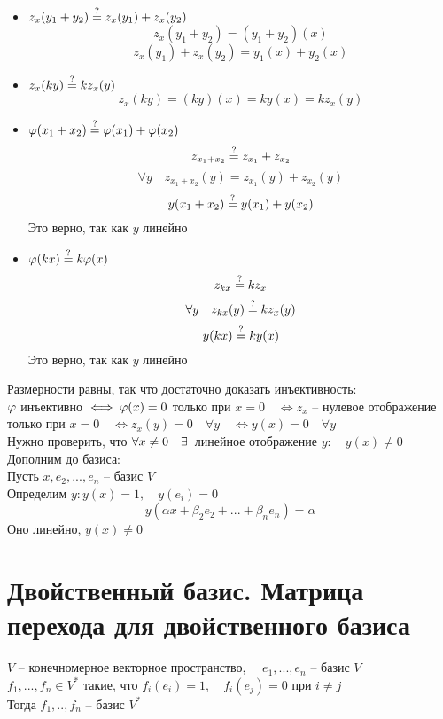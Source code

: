 \begin{eproof}
	\item
	\begin{itemize}
		\item $ z_x(y_1 + y_2) \stackrel?= z_x(y_1) + z_x(y_2) $
		$$ z_x(y_1 + y_2) = (y_1 + y_2)(x) $$
		$$ z_x(y_1) + z_x(y_2) = y_1(x) + y_2(x) $$
		\item $ z_x(ky) \stackrel?= kz_x(y) $
		$$ z_x(ky) = (ky)(x) = ky(x) = kz_x(y) $$
	\end{itemize}

	\item
	\begin{itemize}
		\item $ \varphi(x_1 + x_2) \stackrel?= \varphi(x_1) + \varphi(x_2) $
		$$ z_{x_1 + x_2} \stackrel?= z_{x_1} + z_{x_2} $$
		$$ \forall y \quad z_{x_1 + x_2}(y) = z_{x_1}(y) + z_{x_2}(y) $$
		$$ y(x_1 + x_2) \stackrel?= y(x_1) + y(x_2) $$
		Это верно, так как $ y $ линейно
		\item $ \varphi(kx) \stackrel?= k\varphi(x) $
		$$ z_{kx} \stackrel?= kz_x $$
		$$ \forall y \quad z_{kx}(y) \stackrel?= kz_x(y) $$
		$$ y(kx) \stackrel?= ky(x) $$
		Это верно, так как $ y $ линейно
	\end{itemize}

	\item Размерности равны, так что достаточно доказать инъективность: \\
	$ \varphi $ инъективно $ \iff \varphi(x) = 0 $ только при $ x = 0 \quad \iff z_x $ -- нулевое отображение только при $ x = 0 \quad \iff z_x(y) = 0 \quad \forall y \quad \iff y(x) = 0 \quad \forall y $ \\
	Нужно проверить, что $ \forall x \ne 0 \quad \exists\, $ линейное отображение $ y : \quad y(x) \ne 0 $ \\
	Дополним до базиса: \\
	Пусть $ x, e_2, ..., e_n $ -- базис $ V $ \\
	Определим $ y : y(x) = 1, \quad y(e_i) = 0 $
	$$ y(\alpha x + \beta_2e_2 + ... + \beta_ne_n) = \alpha $$
	Оно линейно, $ y(x) \ne 0 $
\end{eproof}

\section{Двойственный базис. Матрица перехода для двойственного базиса}

\begin{lemma}
	$ V $ -- конечномерное векторное пространство, $ \quad e_1, ..., e_n $ -- базис $ V $ \\
	$ f_1, ..., f_n \in V^* $ такие, что $ f_i(e_i) = 1, \quad f_i(e_j) = 0 $ при $ i \ne j \quad $  \\
	Тогда $ f_1, .., f_n $ -- базис $ V^* $
\end{lemma}

